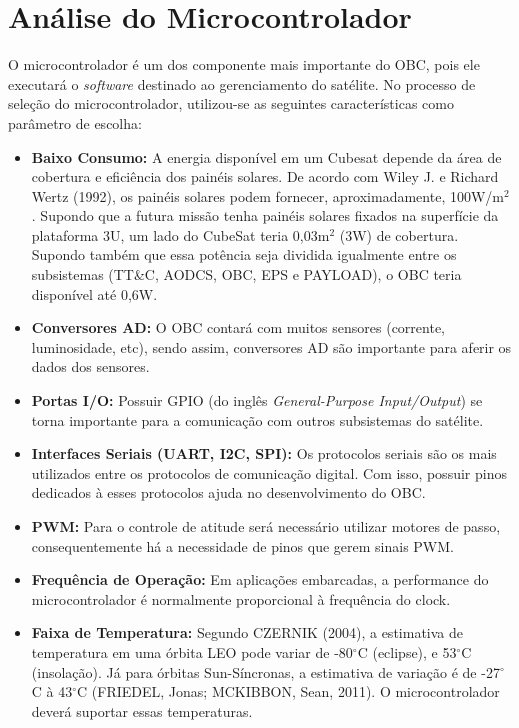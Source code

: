 \section{Análise do Microcontrolador}

O microcontrolador é um dos componente mais importante do OBC, pois ele executará o \textit{software} destinado ao gerenciamento do satélite. No processo de seleção do microcontrolador, utilizou-se as seguintes características como parâmetro de escolha:

\begin{itemize}
\item \textbf{Baixo Consumo:}
A energia disponível em um Cubesat depende da área de cobertura e eficiência dos painéis solares. De acordo com  Wiley J. e Richard Wertz (1992), os painéis solares podem fornecer, aproximadamente, 100W/m$^2$. Supondo que a futura missão tenha painéis solares fixados na superfície da plataforma 3U, um lado do CubeSat teria 0,03m$^2$ (3W) de cobertura. Supondo também que essa potência seja dividida igualmente entre os subsistemas (TT\&C, AODCS, OBC, EPS e PAYLOAD), o OBC teria disponível até 0,6W.

\item \textbf{Conversores AD:}
O OBC contará com muitos sensores (corrente, luminosidade, etc), sendo assim, conversores AD são importante para aferir os dados dos sensores. 

\item \textbf{Portas I/O:}
Possuir GPIO (do inglês \textit{General-Purpose Input/Output}) se torna importante para a comunicação com outros subsistemas do satélite. 

\item \textbf{Interfaces Seriais (UART, I2C, SPI):}
Os protocolos seriais são os mais utilizados entre os protocolos de comunicação digital. Com isso, possuir pinos dedicados à esses protocolos ajuda no desenvolvimento do OBC.

\item \textbf{PWM:}
Para o controle de atitude será necessário utilizar motores de passo, consequentemente há a necessidade de pinos que gerem sinais PWM.

\item \textbf{Frequência de Operação:}
Em aplicações embarcadas, a performance do microcontrolador é normalmente proporcional à frequência do clock.

\item \textbf{Faixa de Temperatura:}
Segundo CZERNIK (2004), a estimativa de temperatura em uma órbita LEO pode variar de -80$^{\circ}$C (eclipse), e 53$^{\circ}$C (insolação). Já para órbitas Sun-Síncronas, a estimativa de variação é de -27$^{\circ}$C à 43$^{\circ}$C (FRIEDEL, Jonas; MCKIBBON, Sean, 2011). O microcontrolador deverá suportar essas temperaturas.
\end{itemize}

